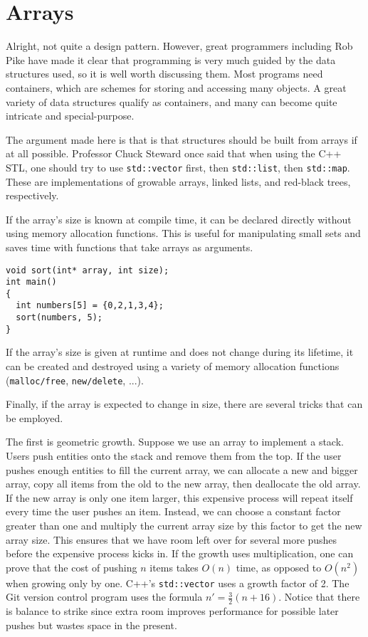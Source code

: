 \documentclass{article}
\begin{document}
\section{Arrays}

Alright, not quite a design pattern.
However, great programmers including Rob Pike have made it clear that
programming is very much guided by the data structures used, so it is well
worth discussing them.
Most programs need containers, which are schemes for storing and accessing
many objects.
A great variety of data structures qualify as containers, and many
can become quite intricate and special-purpose.

The argument made here is that is that structures should be built from
arrays if at all possible.
Professor Chuck Steward once said that when using the C++ STL, one should
try to use \verb+std::vector+ first, then \verb+std::list+, then
\verb+std::map+.
These are implementations of growable arrays, linked lists, and red-black
trees, respectively.

If the array's size is known at compile time, it can be declared directly
without using memory allocation functions.
This is useful for manipulating small sets and saves time with functions
that take arrays as arguments.

\begin{lstlisting}
void sort(int* array, int size);
int main()
{
  int numbers[5] = {0,2,1,3,4};
  sort(numbers, 5);
}
\end{lstlisting}

If the array's size is given at runtime and does not change during its
lifetime, it can be created and destroyed using a variety of memory
allocation functions (\verb+malloc/free+, \verb+new/delete+, ...).

Finally, if the array is expected to change in size, there are several
tricks that can be employed.

The first is geometric growth.
Suppose we use an array to implement a stack.
Users push entities onto the stack and remove them from the top.
If the user pushes enough entities to fill the current array, we
can allocate a new and bigger array, copy all items from the old
to the new array, then deallocate the old array.
If the new array is only one item larger, this expensive process
will repeat itself every time the user pushes an item.
Instead, we can choose a constant factor greater than one and multiply
the current array size by this factor to get the new array size.
This ensures that we have room left over for several more pushes
before the expensive process kicks in.
If the growth uses multiplication, one can prove that the cost
of pushing $n$ items takes $O(n)$ time, as opposed to $O(n^2)$
when growing only by one.
C++'s \verb+std::vector+ uses a growth factor of 2.
The Git version control program uses the formula $n' = \frac32(n + 16)$.
Notice that there is balance to strike since extra room
improves performance for possible later pushes but wastes space
in the present.
\end{document}

